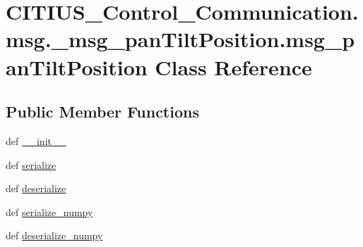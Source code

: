 \hypertarget{class_c_i_t_i_u_s___control___communication_1_1msg_1_1__msg__pan_tilt_position_1_1msg__pan_tilt_position}{\section{\-C\-I\-T\-I\-U\-S\-\_\-\-Control\-\_\-\-Communication.\-msg.\-\_\-msg\-\_\-pan\-Tilt\-Position.\-msg\-\_\-pan\-Tilt\-Position \-Class \-Reference}
\label{class_c_i_t_i_u_s___control___communication_1_1msg_1_1__msg__pan_tilt_position_1_1msg__pan_tilt_position}
}
\subsection*{\-Public \-Member \-Functions}
\begin{DoxyCompactItemize}
\item 
def \hyperlink{class_c_i_t_i_u_s___control___communication_1_1msg_1_1__msg__pan_tilt_position_1_1msg__pan_tilt_position_af21625c79fc5cb3addf6fc320a6b8dda}{\-\_\-\-\_\-init\-\_\-\-\_\-}
\item 
def \hyperlink{class_c_i_t_i_u_s___control___communication_1_1msg_1_1__msg__pan_tilt_position_1_1msg__pan_tilt_position_ae704a902c7f62b27767e4ad032974e7f}{serialize}
\item 
def \hyperlink{class_c_i_t_i_u_s___control___communication_1_1msg_1_1__msg__pan_tilt_position_1_1msg__pan_tilt_position_a4ddd3b8846b737e62cb4e29238cd92c9}{deserialize}
\item 
def \hyperlink{class_c_i_t_i_u_s___control___communication_1_1msg_1_1__msg__pan_tilt_position_1_1msg__pan_tilt_position_a9527407380cab0125772dffc2b92543e}{serialize\-\_\-numpy}
\item 
def \hyperlink{class_c_i_t_i_u_s___control___communication_1_1msg_1_1__msg__pan_tilt_position_1_1msg__pan_tilt_position_afe82e8ea2ba9b2908569bc685334e2f5}{deserialize\-\_\-numpy}
\end{DoxyCompactItemize}
